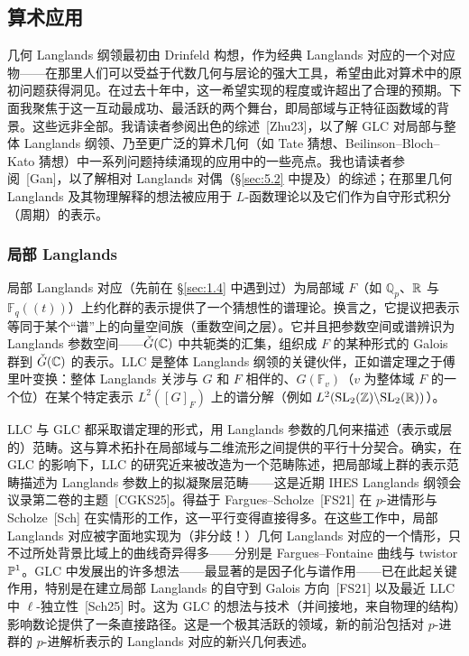 \subsection{算术应用}\label{sec:6.1}

几何 Langlands 纲领最初由 Drinfeld 构想，作为经典 Langlands 对应的一个对应物——在那里人们可以受益于代数几何与层论的强大工具，希望由此对算术中的原初问题获得洞见。在过去十年中，这一希望实现的程度或许超出了合理的预期。下面我聚焦于这一互动最成功、最活跃的两个舞台，即局部域与正特征函数域的背景。这些远非全部。我请读者参阅出色的综述~[Zhu23]，以了解 GLC 对局部与整体 Langlands 纲领、乃至更广泛的算术几何（如 Tate 猜想、Beilinson–Bloch–Kato 猜想）中一系列问题持续涌现的应用中的一些亮点。我也请读者参阅~[Gan]，以了解相对 Langlands 对偶（\S\ref{sec:5.2} 中提及）的综述；在那里几何 Langlands 及其物理解释的想法被应用于 $L$-函数理论以及它们作为自守形式积分（周期）的表示。

\subsubsection{局部 Langlands}\label{sec:6.1.1}

局部 Langlands 对应（先前在 \S\ref{sec:1.4} 中遇到过）为局部域 $F$（如 $\mathbb{Q}_{p}$、$\mathbb{R}$ 与 $\mathbb{F}_{q}((t))$）上约化群的表示提供了一个猜想性的谱理论。换言之，它提议把表示等同于某个“谱”上的向量空间族（重数空间之层）。它并且把参数空间或谱辨识为 Langlands 参数空间——$\check{G}(\mathbb{C})$ 中共轭类的汇集，组织成 $F$ 的某种形式的 Galois 群到 $\check{G}(\mathbb{C})$ 的表示。LLC 是整体 Langlands 纲领的关键伙伴，正如谱定理之于傅里叶变换：整体 Langlands 关涉与 $G$ 和 $F$ 相伴的、$G(\mathbb{F}_{v})$（$v$ 为整体域 $F$ 的一个位）在某个特定表示 $L^{2}([G]_{F})$ 上的谱分解（例如 $L^{2}(\mathrm{SL}_{2}(\mathbb{Z})\backslash\mathrm{SL}_{2}(\mathbb{R}))$）。

LLC 与 GLC 都采取谱定理的形式，用 Langlands 参数的几何来描述（表示或层的）范畴。这与算术拓扑在局部域与二维流形之间提供的平行十分契合。确实，在 GLC 的影响下，LLC 的研究近来被改造为一个范畴陈述，把局部域上群的表示范畴描述为 Langlands 参数上的拟凝聚层范畴——这是近期 IHES Langlands 纲领会议录第二卷的主题~[CGKS25]。得益于 Fargues–Scholze~[FS21] 在 $p$-进情形与 Scholze~[Sch] 在实情形的工作，这一平行变得直接得多。在这些工作中，局部 Langlands 对应被字面地实现为（非分歧！）几何 Langlands 对应的一个情形，只不过所处背景比域上的曲线奇异得多——分别是 Fargues–Fontaine 曲线与 twistor $\mathbb{P}^{1}$。GLC 中发展出的许多想法——最显著的是因子化与谱作用——已在此起关键作用，特别是在建立局部 Langlands 的自守到 Galois 方向~[FS21] 以及最近 LLC 中 $\ell$-独立性~[Sch25] 时。这为 GLC 的想法与技术（并间接地，来自物理的结构）影响数论提供了一条直接路径。这是一个极其活跃的领域，新的前沿包括对 $p$-进群的 $p$-进解析表示的 Langlands 对应的新兴几何表述。

